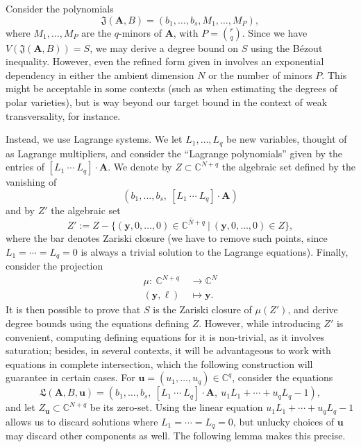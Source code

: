 \documentclass[12pt]{article}
\def\X{S}
\def\frkJ{\mathfrak{J}}
\def\frkL{\mathfrak{L}}
\def\yb{{\bm y}}
\def\C{\mathbb{C}}
\newtheorem{lemma}[theorem]{Lemma}
\begin{document}
Consider the polynomials
\[\frkJ(\bm A, B) = (b_1,\dots,b_s,M_1,\dots,M_P),\]
where $M_1,\dots,M_P$ are the $q$-minors of $\bm A$, with $P={r \choose
q}$. Since we have $V(\frkJ(\bm A, B)) = \X$, we may derive a degree
bound on $\X$ using the B\'ezout inequality. However, even the refined
form given in \cite[Proposition 2.3]{Heintz1980} involves an
exponential dependency in either the ambient dimension $N$ or the
number of minors $P$. This might be acceptable in some contexts (such
as when estimating the degrees of polar varieties), but is way beyond
our target bound in the context of weak transversality, for instance.

Instead, we use Lagrange systems. We let $L_1,\hdots,L_q$ be new
variables, thought of as Lagrange multipliers, and consider the
``Lagrange polynomials'' given by the entries of $ [ L_1 ~\cdots~
  L_q]\cdot \bm A$. We denote by $Z \subset \C^{N+q}$ the algebraic set
defined by the vanishing of
\[ ( b_1,\dots,b_s, \  [ L_1 ~\cdots~ L_q]\cdot \bm A )\]
and by $Z'$ the algebraic set
\[
Z' := \overline{Z - \{(\yb,0,\dots,0) \in \C^{N+q}~|~(\yb,0,\dots,0) \in Z\}},
\]
where the bar denotes Zariski closure (we have to remove such points,
since $L_1=\cdots=L_q=0$ is always a trivial solution to the Lagrange
equations). Finally, consider the projection
\begin{align*} 
  \mu :~ \C^{N+q} &\rightarrow \C^{N}\\
  (\yb,\bm \ell)~ &\mapsto \yb.
\end{align*}
It is then possible to prove that $\X$ is the Zariski closure of
${\mu(Z')}$, and derive degree bounds using the equations defining
$Z$. However, while introducing $Z'$ is convenient, computing defining
equations for it is non-trivial, as it involves saturation; besides,
in several contexts, it will be advantageous to work with equations in
complete intersection, which the following construction will guarantee  in
certain cases. For $\bm u = (u_1,\dots,u_q) \in \C^q$, consider the
equations
\[\frkL(\bm A, B,\bm u) = ( b_1,\dots,b_s, \  [ L_1 ~\cdots~ L_q]\cdot \bm A,\ u_1 L_1 + \cdots + u_q L_q -1 ),\]
and let $Z_{\bm u} \subset \C^{N+q}$ be its zero-set. Using the linear
equation $u_1 L_1 + \cdots + u_q L_q -1$ allows us to discard
solutions where $L_1 = \cdots =L_q = 0$, but unlucky choices of $\bm
u$ may discard other components as well. The following lemma makes this 
precise.

\end{document}
